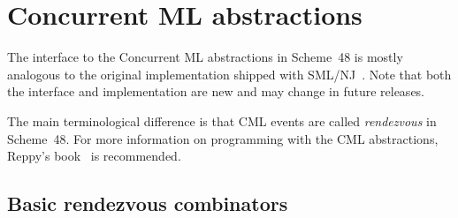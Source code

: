 \section{Concurrent ML abstractions}

The interface to the Concurrent ML abstractions in Scheme~48 is
mostly analogous to the original implementation shipped with
SML/NJ~\cite{Reppy:CML-book}.  Note that both the interface and
implementation are new and may change in future releases.

The main terminological difference is that CML events are called
\textit{rendezvous} in Scheme~48.  For more information on programming
with the CML abstractions, Reppy's book~\cite{Reppy:CML-book} is
recommended.

\subsection{Basic rendezvous combinators}

